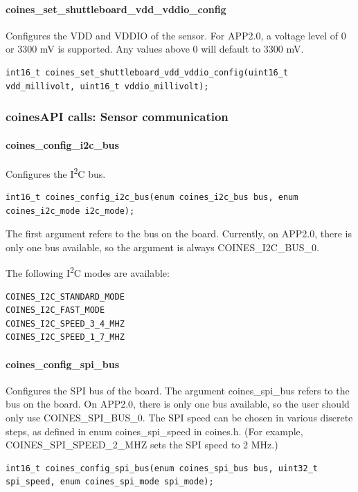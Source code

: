 \paragraph{coines\_set\_shuttleboard\_vdd\_vddio\_config}
Configures the VDD and VDDIO of the sensor. For APP2.0, a voltage level of 0 or 3300 mV is supported. Any values above 0 will default to 3300 mV.

\begin{lstlisting}
int16_t coines_set_shuttleboard_vdd_vddio_config(uint16_t vdd_millivolt, uint16_t vddio_millivolt);
\end{lstlisting}

\subsubsection{coinesAPI calls: Sensor communication}

\paragraph{coines\_config\_i2c\_bus}
Configures the I\textsuperscript{2}C bus. 

\begin{lstlisting}
int16_t coines_config_i2c_bus(enum coines_i2c_bus bus, enum coines_i2c_mode i2c_mode);
\end{lstlisting}

The first argument refers to the bus on the board. Currently, on APP2.0, there is only one bus available, so the argument is always COINES\_I2C\_BUS\_0.

The following I\textsuperscript{2}C modes are available:
\begin{lstlisting}
COINES_I2C_STANDARD_MODE
COINES_I2C_FAST_MODE
COINES_I2C_SPEED_3_4_MHZ
COINES_I2C_SPEED_1_7_MHZ
\end{lstlisting}

\paragraph{coines\_config\_spi\_bus}
Configures the SPI bus of the board. The argument coines\_spi\_bus refers to the bus on the board. On APP2.0, there is only one bus available, so the user should only use COINES\_SPI\_BUS\_0. The SPI speed can be chosen in various discrete steps, as defined in enum coines\_spi\_speed in coines.h. (For example, COINES\_SPI\_SPEED\_2\_MHZ sets the SPI speed to 2 MHz.)

\begin{lstlisting}
int16_t coines_config_spi_bus(enum coines_spi_bus bus, uint32_t spi_speed, enum coines_spi_mode spi_mode);
\end{lstlisting}

